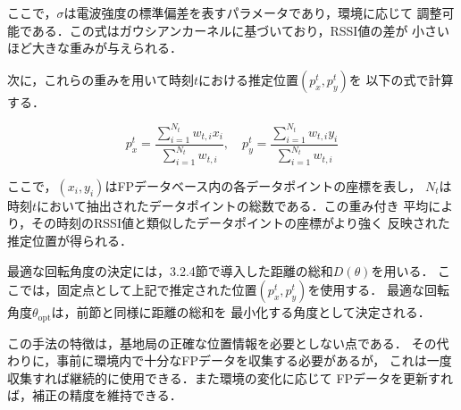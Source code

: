 ここで，$\sigma$は電波強度の標準偏差を表すパラメータであり，環境に応じて
調整可能である．この式はガウシアンカーネルに基づいており，RSSI値の差が
小さいほど大きな重みが与えられる．

次に，これらの重みを用いて時刻$t$における推定位置$(p_x^t, p_y^t)$を
以下の式で計算する．

\begin{equation}
p_x^t = \frac{\sum_{i=1}^{N_t} w_{t,i} x_i}{\sum_{i=1}^{N_t} w_{t,i}}, \quad
p_y^t = \frac{\sum_{i=1}^{N_t} w_{t,i} y_i}{\sum_{i=1}^{N_t} w_{t,i}}
\end{equation}

ここで，$(x_i, y_i)$はFPデータベース内の各データポイントの座標を表し，
$N_t$は時刻$t$において抽出されたデータポイントの総数である．この重み付き
平均により，その時刻のRSSI値と類似したデータポイントの座標がより強く
反映された推定位置が得られる．

最適な回転角度の決定には，3.2.4節で導入した距離の総和$D(\theta)$を用いる．
ここでは，固定点として上記で推定された位置$(p_x^t, p_y^t)$を使用する．
最適な回転角度$\theta_{\mathrm{opt}}$は，前節と同様に距離の総和を
最小化する角度として決定される．

この手法の特徴は，基地局の正確な位置情報を必要としない点である．
その代わりに，事前に環境内で十分なFPデータを収集する必要があるが，
これは一度収集すれば継続的に使用できる．また環境の変化に応じて
FPデータを更新すれば，補正の精度を維持できる．



